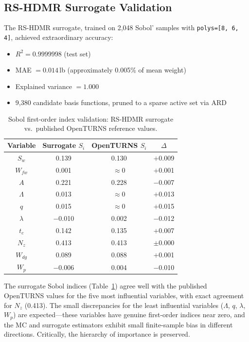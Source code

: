 \documentclass[11pt,a4paper]{article}
\begin{document}
\subsection{RS-HDMR Surrogate Validation}

The RS-HDMR surrogate, trained on 2,048 Sobol' samples with \texttt{polys=[8, 6, 4]}, achieved extraordinary accuracy:

\begin{itemize}[nosep]
    \item $R^2 = 0.9999998$ (test set)
    \item MAE $= 0.014$\,lb (approximately 0.005\% of mean weight)
    \item Explained variance $= 1.000$
    \item 9,380 candidate basis functions, pruned to a sparse active set via ARD
\end{itemize}

\begin{table}[H]
\centering
\caption{Sobol first-order index validation: RS-HDMR surrogate vs.\ published OpenTURNS reference values.}
\label{tab:sobol_validation}
\begin{tabular}{cccc}
\toprule
\textbf{Variable} & \textbf{Surrogate $S_i$} & \textbf{OpenTURNS $S_i$} & \textbf{$\Delta$} \\
\midrule
$S_w$   & 0.139 & 0.130 & $+$0.009 \\
$W_{fw}$ & 0.001 & $\approx 0$ & $+$0.001 \\
$A$     & 0.221 & 0.228 & $-$0.007 \\
$\Lambda$ & 0.013 & $\approx 0$ & $+$0.013 \\
$q$     & 0.015 & $\approx 0$ & $+$0.015 \\
$\lambda$ & $-$0.010 & 0.002 & $-$0.012 \\
$t_c$   & 0.142 & 0.135 & $+$0.007 \\
$N_z$   & 0.413 & 0.413 & $\pm$0.000 \\
$W_{dg}$ & 0.089 & 0.088 & $+$0.001 \\
$W_p$   & $-$0.006 & 0.004 & $-$0.010 \\
\bottomrule
\end{tabular}
\end{table}

The surrogate Sobol indices (Table~\ref{tab:sobol_validation}) agree well with the published OpenTURNS values for the five most influential variables, with exact agreement for $N_z$ (0.413). The small discrepancies for the least influential variables ($\Lambda$, $q$, $\lambda$, $W_p$) are expected---these variables have genuine first-order indices near zero, and the MC and surrogate estimators exhibit small finite-sample bias in different directions. Critically, the hierarchy of importance is preserved.
\end{document}

